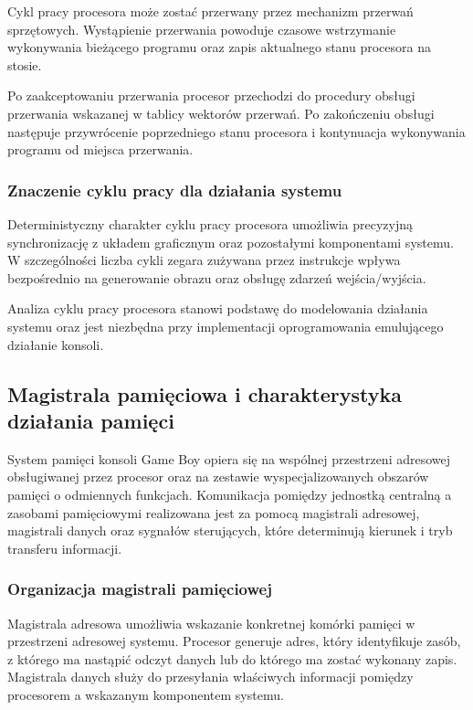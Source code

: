 \documentclass{article}
\begin{document}
Cykl pracy procesora może zostać przerwany przez mechanizm przerwań sprzętowych. Wystąpienie przerwania powoduje czasowe wstrzymanie wykonywania bieżącego programu oraz zapis aktualnego stanu procesora na stosie.

Po zaakceptowaniu przerwania procesor przechodzi do procedury obsługi przerwania wskazanej w tablicy wektorów przerwań. Po zakończeniu obsługi następuje przywrócenie poprzedniego stanu procesora i kontynuacja wykonywania programu od miejsca przerwania.

\subsubsection{Znaczenie cyklu pracy dla działania systemu}

Deterministyczny charakter cyklu pracy procesora umożliwia precyzyjną synchronizację z układem graficznym oraz pozostałymi komponentami systemu. W szczególności liczba cykli zegara zużywana przez instrukcje wpływa bezpośrednio na generowanie obrazu oraz obsługę zdarzeń wejścia/wyjścia.

Analiza cyklu pracy procesora stanowi podstawę do modelowania działania systemu oraz jest niezbędna przy implementacji oprogramowania emulującego działanie konsoli.
\subsection{Magistrala pamięciowa i charakterystyka działania pamięci}

System pamięci konsoli Game Boy opiera się na wspólnej przestrzeni adresowej obsługiwanej przez procesor oraz na zestawie wyspecjalizowanych obszarów pamięci o odmiennych funkcjach. Komunikacja pomiędzy jednostką centralną a zasobami pamięciowymi realizowana jest za pomocą magistrali adresowej, magistrali danych oraz sygnałów sterujących, które determinują kierunek i tryb transferu informacji.

\subsubsection{Organizacja magistrali pamięciowej}

Magistrala adresowa umożliwia wskazanie konkretnej komórki pamięci w przestrzeni adresowej systemu. Procesor generuje adres, który identyfikuje zasób, z którego ma nastąpić odczyt danych lub do którego ma zostać wykonany zapis. Magistrala danych służy do przesyłania właściwych informacji pomiędzy procesorem a wskazanym komponentem systemu.
\end{document}
